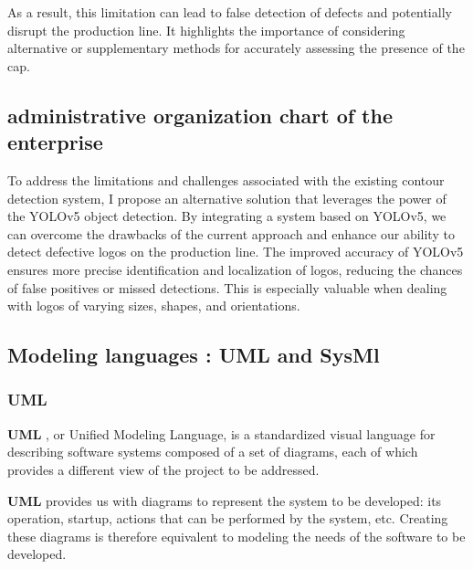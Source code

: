 As a result, this limitation can lead to false detection of defects and potentially disrupt the production line. It highlights the importance of considering alternative or supplementary methods for accurately assessing the presence of the cap.

\subsection{administrative organization chart of the enterprise}
To address the limitations and challenges associated with the existing contour detection system, I propose an alternative solution that leverages the power of the YOLOv5 object detection.
By integrating a system based on YOLOv5, we can overcome the drawbacks of the current approach and enhance our ability to detect defective logos on the production line. The improved accuracy of YOLOv5 ensures more precise identification and localization of logos, reducing the chances of false positives or missed detections. This is especially valuable when dealing with logos of varying sizes, shapes, and orientations.
\vspace{1em}

\subsection{Modeling languages : UML and SysMl}
\subsubsection{UML}

\textbf{UML} , or Unified Modeling Language, is a standardized visual language for describing software systems composed of a set of diagrams, each of which provides a different view of the project to be addressed.\cite{HMB03}

\textbf{UML}  provides us with diagrams to represent the system to be developed: its operation, startup, actions that can be performed by the system, etc. Creating these diagrams is therefore equivalent to modeling the needs of the software to be developed.\cite{HMB03}

